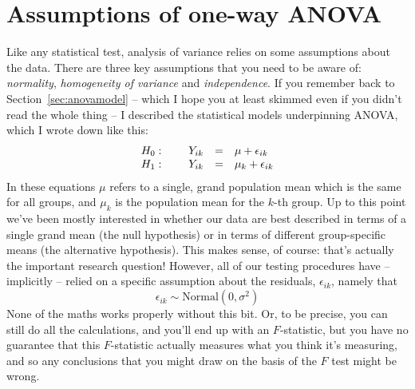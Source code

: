 \section{Assumptions of one-way ANOVA \label{sec:anovaassumptions}}

Like any statistical test, analysis of variance relies on some assumptions about the data. There are three key assumptions that you need to be aware of: {\it normality}, {\it homogeneity of variance} and {\it independence}. If you remember back to Section~\ref{sec:anovamodel} -- which I hope you at least skimmed even if you didn't read the whole thing -- I described the statistical models underpinning ANOVA, which I wrote down like this:
$$
\begin{array}{lrcl}
H_0: \hspace*{.5cm} & Y_{ik} &=& \mu + \epsilon_{ik} \\
H_1: & Y_{ik} &=& \mu_k + \epsilon_{ik} 
\end{array}
$$
In these equations $\mu$ refers to a single, grand population mean which is the same for all groups, and $\mu_k$ is the population mean for the $k$-th group. Up to this point we've been mostly interested in whether our data are best described in terms of a single grand mean (the null hypothesis) or in terms of different group-specific means (the alternative hypothesis). This makes sense, of course: that's actually the important research question! However, all of our testing procedures have -- implicitly -- relied on a specific assumption about the residuals, $\epsilon_{ik}$, namely that
$$
\epsilon_{ik} \sim \mbox{Normal}(0, \sigma^2)
$$
None of the maths works properly without this bit. Or, to be precise, you can still do all the calculations, and you'll end up with an $F$-statistic, but you have no guarantee that this $F$-statistic actually measures what you think it's measuring, and so any conclusions that you might draw on the basis of the $F$ test might be wrong. 

